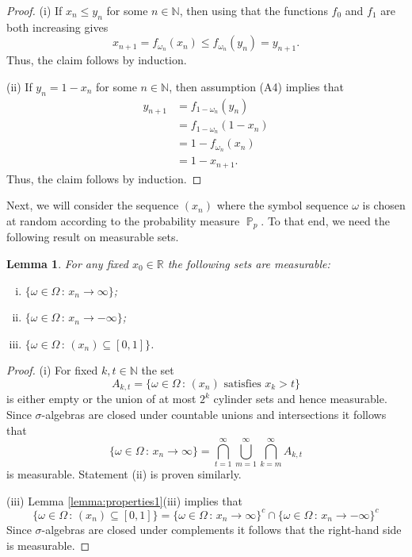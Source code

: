 \documentclass[a4paper,12pt]{article}
\newtheorem{lemma}{Lemma}[section]
\DeclareMathOperator{\prob}{\mathbb{P}}
\begin{document}
\begin{proof}
(i) If $x_n \leq y_n$ for some $n \in \mathbb{N}$, then using that the functions $f_0$ and $f_1$ are both increasing gives
\[
x_{n+1} = f_{\omega_n}(x_n) \leq f_{\omega_n}(y_n) = y_{n+1}.
\]
Thus, the claim follows by induction.

(ii) If $y_n = 1-x_n$ for some $n \in \mathbb{N}$, then assumption (A4) implies that
\[
\begin{split}
y_{n+1}
	& = f_{1-\omega_n}(y_n) \\
	& = f_{1-\omega_n}(1-x_n) \\
	& = 1-f_{\omega_n}(x_n) \\
	& = 1-x_{n+1}.
\end{split}
\]
Thus, the claim follows by induction.
\end{proof}

Next, we will consider the sequence $(x_n)$ where the symbol sequence $\omega$ is chosen at random according to the probability measure $\prob_p$. To that end, we need the following result on measurable sets.

\begin{lemma}
\label{lemma:measurable}
For any fixed $x_0 \in \mathbb{R}$ the following sets are measurable:
\begin{enumerate}[(i)]
\item $\{\omega \in \Omega \,:\, x_n \to \infty\}$;
\item $\{\omega \in \Omega \,:\, x_n \to -\infty\}$;
\item $\{\omega \in \Omega \,:\, (x_n) \subseteq [0,1] \}$.
\end{enumerate}

\end{lemma}

\begin{proof}
(i) For fixed $k, t \in \mathbb{N}$ the set
\[
A_{k,t} = \{ \omega \in \Omega \,:\, (x_n) \text{ satisfies } x_k > t \}
\]
is either empty or the union of at most $2^k$ cylinder sets and hence measurable. Since $\sigma$-algebras are closed under countable unions and intersections it follows that
\[
\{\omega \in \Omega \,:\, x_n \to \infty\}
	= \bigcap_{t = 1}^\infty \bigcup_{m=1}^\infty \bigcap_{k=m}^\infty A_{k,t}
\]
is measurable. Statement (ii) is proven similarly.

(iii) Lemma \ref{lemma:properties1}(iii) implies that
\[
\{\omega \in \Omega \,:\, (x_n) \subseteq [0,1] \}
	= \{\omega \in \Omega \,:\, x_n \to \infty\}^c \cap \{\omega \in \Omega \,:\, x_n \to -\infty\}^c
\]
Since $\sigma$-algebras are closed under complements it follows that the right-hand side is measurable.
\end{proof}
\end{document}
